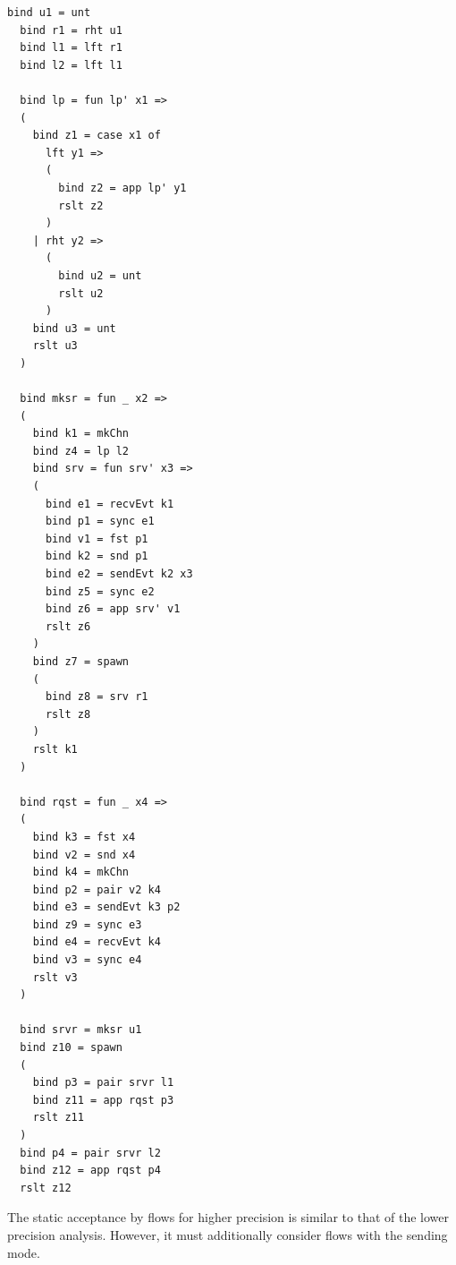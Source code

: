 \documentclass[letterpaper, 11pt]{extarticle}
\begin{document}
\begin{lstlisting}[language=normal_lang, mathescape]
  bind u1 = unt
  bind r1 = rht u1
  bind l1 = lft r1
  bind l2 = lft l1

  bind lp = fun lp' x1 => 
  (
    bind z1 = case x1 of 
      lft y1 =>
      (
        bind z2 = app lp' y1
        rslt z2
      )
    | rht y2 =>
      (
        bind u2 = unt
        rslt u2
      )
    bind u3 = unt
    rslt u3
  )

  bind mksr = fun _ x2 => 
  (
    bind k1 = mkChn
    bind z4 = lp l2
    bind srv = fun srv' x3 =>
    (
      bind e1 = recvEvt k1
      bind p1 = sync e1
      bind v1 = fst p1
      bind k2 = snd p1 
      bind e2 = sendEvt k2 x3
      bind z5 = sync e2
      bind z6 = app srv' v1
      rslt z6 
    )
    bind z7 = spawn
    (
      bind z8 = srv r1
      rslt z8
    )
    rslt k1
  )

  bind rqst = fun _ x4 =>
  (
    bind k3 = fst x4
    bind v2 = snd x4
    bind k4 = mkChn
    bind p2 = pair v2 k4
    bind e3 = sendEvt k3 p2
    bind z9 = sync e3
    bind e4 = recvEvt k4
    bind v3 = sync e4
    rslt v3
  )

  bind srvr = mksr u1
  bind z10 = spawn
  ( 
    bind p3 = pair srvr l1
    bind z11 = app rqst p3
    rslt z11
  )
  bind p4 = pair srvr l2
  bind z12 = app rqst p4
  rslt z12
\end{lstlisting}


The static acceptance by flows for higher precision is similar to that of the lower precision analysis.
However, it must additionally consider flows with the sending mode. 
\end{document}
